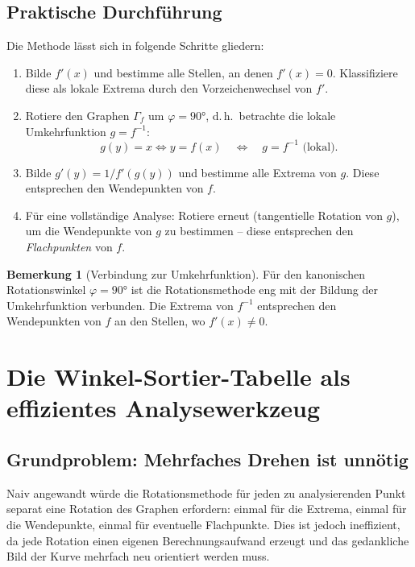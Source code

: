 ﻿\documentclass[12pt, a4paper]{article}
\theoremstyle{definition}
\newtheorem{bemerkung}{Bemerkung}[section]
\begin{document}
	\subsection{Praktische Durchführung}
	
	Die Methode lässt sich in folgende Schritte gliedern:
	
	\begin{enumerate}[label=\textbf{Schritt \arabic*:}]
		\item Bilde $f'(x)$ und bestimme alle Stellen, an denen $f'(x) = 0$.
		Klassifiziere diese als lokale Extrema durch den Vorzeichenwechsel von $f'$.
		
		\item Rotiere den Graphen $\Gamma_f$ um $\varphi = 90 °$, d.\,h.\ betrachte
		die lokale Umkehrfunktion $g = f^{-1}$:
		\[
		g(y) = x \iff y = f(x)
		\quad \Longleftrightarrow \quad
		g = f^{-1} \text{ (lokal)}.
		\]
		
		\item Bilde $g'(y) = 1/f'(g(y))$ und bestimme alle Extrema von $g$.
		Diese entsprechen den Wendepunkten von $f$.
		
		\item Für eine vollständige Analyse: Rotiere erneut (tangentielle Rotation
		von $g$), um die Wendepunkte von $g$ zu bestimmen -- diese
		entsprechen den \emph{Flachpunkten} von $f$.
	\end{enumerate}
	
	\begin{bemerkung}[Verbindung zur Umkehrfunktion]
		Für den kanonischen Rotationswinkel $\varphi = 90 °$ ist die Rotationsmethode
		eng mit der Bildung der Umkehrfunktion verbunden. Die Extrema von $f^{-1}$
		entsprechen den Wendepunkten von $f$ an den Stellen, wo $f'(x) \neq 0$.
	\end{bemerkung}
	
	\section{Die Winkel-Sortier-Tabelle als effizientes Analysewerkzeug}
	
	\subsection{Grundproblem: Mehrfaches Drehen ist unnötig}
	
	Naiv angewandt würde die Rotationsmethode für jeden zu analysierenden
	Punkt separat eine Rotation des Graphen erfordern: einmal für die Extrema,
	einmal für die Wendepunkte, einmal für eventuelle Flachpunkte. Dies ist
	jedoch ineffizient, da jede Rotation einen eigenen Berechnungsaufwand
	erzeugt und das gedankliche Bild der Kurve mehrfach neu orientiert werden muss.
	
\end{document}
